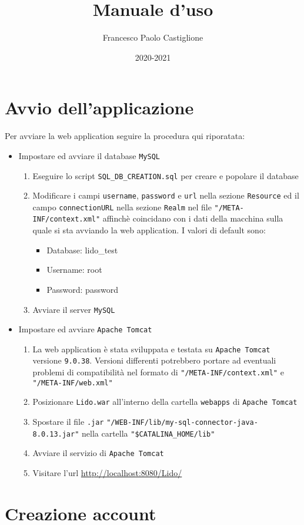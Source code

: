 \documentclass{article}
\title{Manuale d'uso}
\author{Francesco Paolo Castiglione}
\date{2020-2021}
\begin{document}
\maketitle

\tableofcontents

\section{Avvio dell'applicazione}

Per avviare la web application seguire la procedura qui riporatata:

\begin{itemize}
	\item Impostare ed avviare il database \texttt{MySQL}
	\begin{enumerate}
		\item Eseguire lo script \texttt{SQL\_DB\_CREATION.sql} per creare e popolare il database
		\item Modificare i campi \texttt{username}, \texttt{password} e \texttt{url} nella sezione \texttt{Resource} ed il campo \texttt{connectionURL} nella sezione \texttt{Realm} nel file \texttt{"/META-INF/context.xml"} affinchè coincidano con i dati della macchina sulla quale si sta avviando la web application.\newline	
		I valori di default sono:
		\begin{itemize}
			\item Database: lido\_test
			\item Username: root
			\item Password: password
		\end{itemize}
		\item Avviare il server \texttt{MySQL}
	\end{enumerate}
	\item Impostare ed avviare \texttt{Apache Tomcat}
	\begin{enumerate}
		\item La web application è stata sviluppata e testata su \texttt{Apache Tomcat} versione \texttt{9.0.38}. Versioni differenti potrebbero portare ad eventuali problemi di compatibilità nel formato di \texttt{"/META-INF/context.xml"} e \texttt{"/META-INF/web.xml"}
		\item Posizionare \texttt{Lido.war} all'interno della cartella \texttt{webapps} di \texttt{Apache Tomcat}
		\item Spostare il file \texttt{.jar} \texttt{"/WEB-INF/lib/my-sql-connector-java-8.0.13.jar"} nella cartella \texttt{"\$CATALINA\_HOME/lib"}
		\item Avviare il servizio di \texttt{Apache Tomcat}
		\item Visitare l'url \url{http://localhost:8080/Lido/}
	\end{enumerate}
\end{itemize}

\section{Creazione account}
\end{document}
